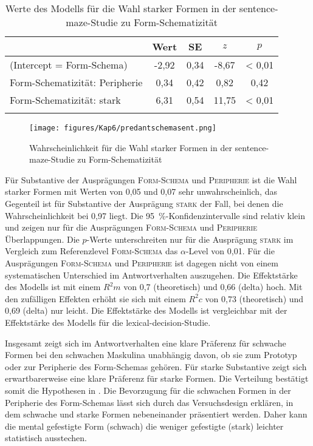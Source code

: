 \begin{table}
\begin{tabular}{l S[table-format=-1.2] S[table-format=1.2] S[table-format=-1.2] S[table-format=<1.2]}
\lsptoprule
& {Wert} & {SE} & {$z$} & {$p$} \\\midrule
(Intercept = Form-Schema) & -2,92 & 0,34 & -8,67 & < 0,01 \\ 
Form-Schematizität: Peripherie & 0,34 & 0,42 & 0,82 & 0,42 \\ 
Form-Schematizität: stark & 6,31 & 0,54 & 11,75 & < 0,01 \\  
\lspbottomrule
\end{tabular}
\caption{Werte des Modells für die Wahl starker Formen in der sentence-maze-Studie zu Form-Schematizität}
\label{ergsentmazeschema}
\end{table}


\begin{figure}
\texttt{[image: figures/Kap6/predantschemasent.png]} 
\caption{Wahrscheinlichkeit für die Wahl starker Formen in der sentence-maze-Studie zu Form-Schema\-ti\-zi\-tät}
\label{predschemasent}
\end{figure}

Für Substantive der Ausprägungen \textsc{Form-Schema} und \textsc{Peripherie} ist die Wahl starker Formen mit Werten von 0,05 und 0,07 sehr unwahrscheinlich, das Gegenteil ist für Substantive der Ausprägung \textsc{stark} der Fall, bei denen die Wahrscheinlichkeit bei 0,97 liegt. Die 95~\%-Konfidenzintervalle sind relativ klein und zeigen nur für die Ausprägungen \textsc{Form-Schema} und \textsc{Peripherie} Überlappungen. Die $p$-Werte unterschreiten nur für die Ausprägung \textsc{stark} im Vergleich zum Referenzlevel \textsc{Form-Schema} das $\alpha$-Level von 0,01. Für die Ausprägungen \textsc{Form-Schema} und \textsc{Peripherie} ist dagegen nicht von einem systematischen Unterschied im Antwortverhalten auszugehen.  Die Effektstärke des Modells ist mit einem $R^2m$ von 0,7 (theoretisch) und 0,66 (delta) hoch. Mit den zufälligen Effekten erhöht sie sich mit einem $R^2c$ von 0,73 (theoretisch) und 0,69 (delta) nur leicht. Die Effektstärke des Modells ist vergleichbar mit der Effektstärke des Modells für die lexical-decision-Studie.

Insgesamt zeigt sich im Antwortverhalten eine klare Präferenz für schwache Formen bei den schwachen Maskulina unabhängig davon, ob sie zum Prototyp oder zur Peripherie des Form-Schemas gehören. Für starke Substantive zeigt sich erwartbarerweise eine klare Präferenz für starke Formen. Die Verteilung bestätigt somit die Hypothesen in . Die Bevorzugung für die schwachen Formen in der Peripherie des Form-Schemas lässt sich durch das Versuchsdesign erklären, in dem schwache und starke Formen nebeneinander präsentiert werden. Daher kann die mental gefestigte Form (schwach) die weniger gefestigte (stark) leichter statistisch ausstechen.

